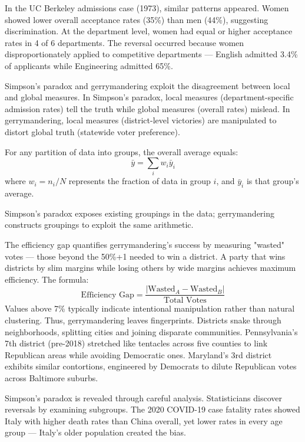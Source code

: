   \vspace{1em}

In the UC Berkeley admissions case (1973), similar patterns appeared. Women showed lower overall acceptance rates (35\%) than men (44\%), suggesting discrimination. At the department level, women had equal or higher acceptance rates in 4 of 6 departments. The reversal occurred because women disproportionately applied to competitive departments — English admitted 3.4\% of applicants while Engineering admitted 65\%. 

Simpson’s paradox and gerrymandering exploit the disagreement between local and global measures. In Simpson's paradox, local measures (department-specific admission rates) tell the truth while global measures (overall rates) mislead. In gerrymandering, local measures (district-level victories) are manipulated to distort global truth (statewide voter preference).

For any partition of data into groups, the overall average equals:
\[
\bar{y} = \sum_{i} w_i \bar{y}_i
\]
where $w_i = n_i/N$ represents the fraction of data in group $i$, and $\bar{y}_i$ is that group's average.

Simpson’s paradox exposes existing groupings in the data; gerrymandering constructs groupings to exploit the same arithmetic.

The efficiency gap quantifies gerrymandering's success by measuring "wasted" votes — those beyond the 50\%+1 needed to win a district. A party that wins districts by slim margins while losing others by wide margins achieves maximum efficiency. The formula:
\[
\text{Efficiency Gap} = \frac{|\text{Wasted}_A - \text{Wasted}_B|}{\text{Total Votes}}
\]
Values above 7\% typically indicate intentional manipulation rather than natural clustering. Thus, gerrymandering leaves fingerprints. Districts snake through neighborhoods, splitting cities and joining disparate communities. Pennsylvania's 7th district (pre-2018) stretched like tentacles across five counties to link Republican areas while avoiding Democratic ones. Maryland's 3rd district exhibits similar contortions, engineered by Democrats to dilute Republican votes across Baltimore suburbs. 

Simpson's paradox is revealed through careful analysis. Statisticians discover reversals by examining subgroups. The 2020 COVID-19 case fatality rates showed Italy with higher death rates than China overall, yet lower rates in every age group — Italy's older population created the bias.

